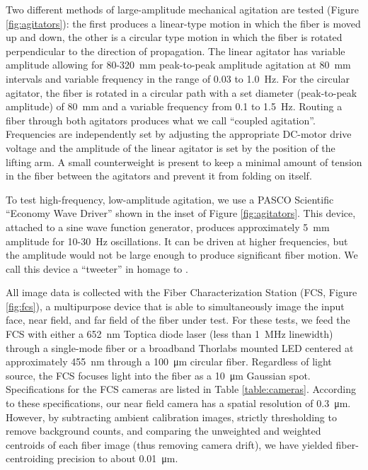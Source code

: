 \documentclass[twocolumn]{emulateapj}
\begin{document}
Two different methods of large-amplitude mechanical agitation are tested (Figure \ref{fig:agitators}): the first produces a linear-type motion in which the fiber is moved up and down, the other is a circular type motion in which the fiber is rotated perpendicular to the direction of propagation. The linear agitator has variable amplitude allowing for 80-\SI{320}{\milli\meter} peak-to-peak amplitude agitation at \SI{80}{\milli\meter} intervals and variable frequency in the range of 0.03 to \SI{1.0}{\hertz}. For the circular agitator, the fiber is rotated in a circular path with a set diameter (peak-to-peak amplitude) of \SI{80}{\milli\meter} and a variable frequency from 0.1 to \SI{1.5}{\hertz}. Routing a fiber through both agitators produces what we call ``coupled agitation''.  Frequencies are independently set by adjusting the appropriate DC-motor drive voltage and the amplitude of the linear agitator is set by the position of the lifting arm. A small counterweight is present to keep a minimal amount of tension in the fiber between the agitators and prevent it from folding on itself.

To test high-frequency, low-amplitude agitation, we use a PASCO Scientific ``Economy Wave Driver'' shown in the inset of Figure \ref{fig:agitators}. This device, attached to a sine wave function generator, produces approximately \SI{5}{\milli\meter} amplitude for 10-\SI{30}{\hertz} oscillations. It can be driven at higher frequencies, but the amplitude would not be large enough to produce significant fiber motion. We call this device a ``tweeter'' in homage to \citet{Plavchan2013}.

All image data is collected with the Fiber Characterization Station (FCS, Figure \ref{fig:fcs}), a multipurpose device that is able to simultaneously image the input face, near field, and far field of the fiber under test. For these tests, we feed the FCS with either a \SI{652}{\nano\meter} Toptica diode laser (less than \SI{1}{\mega\hertz} linewidth) through a single-mode fiber or a broadband Thorlabs mounted LED centered at approximately \SI{455}{\nano\meter} through a \SI{100}{\micro\meter} circular fiber. Regardless of light source, the FCS focuses light into the fiber as a \SI{10}{\micro\meter} Gaussian spot. Specifications for the FCS cameras are listed in Table \ref{table:cameras}. According to these specifications, our near field camera has a spatial resolution of \SI{0.3}{\micro\meter}. However, by subtracting ambient calibration images, strictly thresholding to remove background counts, and comparing the unweighted and weighted centroids of each fiber image (thus removing camera drift), we have yielded fiber-centroiding precision to about \SI{0.01}{\micro\meter}.
\end{document}
